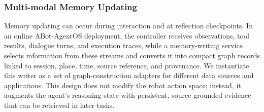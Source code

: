 \subsubsection{Multi-modal Memory Updating}
\label{sec:memory_writing}


Memory updating can occur during interaction and at reflection checkpoints.
In an online ABot-AgentOS deployment, the controller receives observations, tool results, dialogue turns, and execution traces, while a memory-writing service selects information from these streams and converts it into compact graph records linked to session, place, time, source reference, and provenance.
We instantiate this writer as a set of graph-construction adapters for different data sources and applications.
This design does not modify the robot action space; instead, it augments the agent's reasoning state with persistent, source-grounded evidence that can be retrieved in later tasks.




